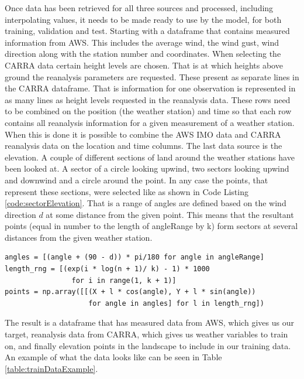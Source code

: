 Once data has been retrieved for all three sources and processed, including interpolating values, it needs to be made ready to use by the model, for both training, validation and test. Starting with a dataframe that contains measured information from AWS. This includes the average wind, the wind gust, wind direction along with the station number and coordinates. When selecting the CARRA data certain height levels are chosen. That is at which heights above ground the reanalysis parameters are requested. These present as separate lines in the CARRA dataframe. That is information for one observation is represented in as many lines as height levels requested in the reanalysis data. These rows need to be combined on the position (the weather station) and time so that each row contains all reanalysis information for a given measurement of a weather station. When this is done it is possible to combine the AWS IMO data and CARRA reanalysis data on the location and time columns. The last data source is the elevation. A couple of different sections of land around the weather stations have been looked at. A sector of a circle looking upwind, two sectors looking upwind and downwind and a circle around the point. In any case the points, that represent these sections, were selected like as shown in Code Listing \ref{code:sectorElevation}. That is a range of angles are defined based on the wind direction $d$ at some distance from the given point. This means that the resultant points (equal in number to the length of angleRange by k) form sectors at several distances from the given weather station.

\begin{lstlisting}[style = Python, caption = {Sector elevation points generated}, label = code:sectorElevation]
angles = [(angle + (90 - d)) * pi/180 for angle in angleRange]
length_rng = [(exp(i * log(n + 1)/ k) - 1) * 1000 
                for i in range(1, k + 1)]
points = np.array([[(X + l * cos(angle), Y + l * sin(angle))
                    for angle in angles] for l in length_rng])   
\end{lstlisting}

The result is a dataframe that has measured data from AWS, which gives us our target, reanalysis data from CARRA, which gives us weather variables to train on, and finally elevation points in the landscape to include in our training data. An example of what the data looks like can be seen in Table \ref{table:trainDataExample}.

\begin{table}[h]
    \caption{An example of data structure used with model}
    \label{table:trainDataExample}
\end{table}

